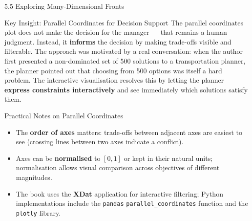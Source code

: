 \documentclass[aspectratio=169,10pt]{beamer}
\begin{document}
\begin{frame}[allowframebreaks]{5.5 Exploring Many-Dimensional Fronts}
\framebreak

  \begin{alertblock}{Key Insight: Parallel Coordinates for Decision Support}
    The parallel coordinates plot does not make the decision for the manager
    — that remains a human judgment.  Instead, it \textbf{informs} the
    decision by making trade-offs visible and filterable.  The approach was
    motivated by a real conversation: when the author first presented a
    non-dominated set of 500 solutions to a transportation planner, the
    planner pointed out that choosing from 500 options was itself a hard
    problem.  The interactive visualisation resolves this by letting the
    planner \textbf{express constraints interactively} and see immediately
    which solutions satisfy them.
  \end{alertblock}

  \begin{block}{Practical Notes on Parallel Coordinates}
    \begin{itemize}
      \item The \textbf{order of axes} matters: trade-offs between
            adjacent axes are easiest to see (crossing lines between two
            axes indicate a conflict).
      \item Axes can be \textbf{normalised} to $[0,1]$ or kept in their
            natural units; normalisation allows visual comparison across
            objectives of different magnitudes.
      \item The book uses the \textbf{XDat} application for interactive
            filtering; Python implementations include the
            \texttt{pandas} \texttt{parallel\_coordinates} function and
            the \texttt{plotly} library.
    \end{itemize}
  \end{block}

\end{frame}
\end{document}

